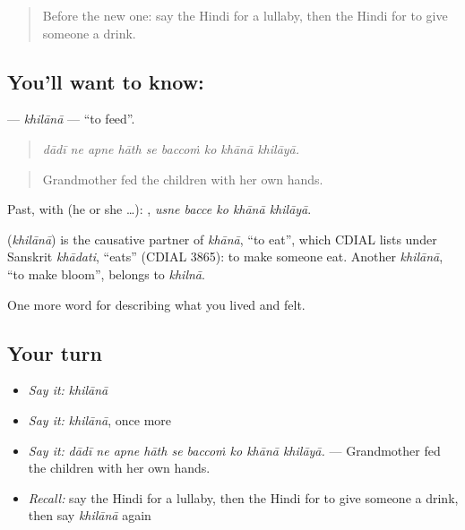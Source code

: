 \label{lesson:HI-C498-khilana}



\begin{quote}
Before the new one: say the Hindi for a lullaby, then the Hindi for to give someone a drink.
\end{quote}

\subsection*{You'll want to know: }
\textbf{} — \emph{khilānā} — \textquotedblleft{}to feed\textquotedblright{}.

\begin{quote}
        
\end{quote}

\begin{quote}
\emph{dādī ne apne hāth se baccoṁ ko khānā khilāyā.}
\end{quote}

\begin{quote}
Grandmother fed the children with her own hands.
\end{quote}

Past, with  (he or she …):     , \emph{usne bacce ko khānā khilāyā}.

\begin{cousinweb}
\textbf{} (\emph{khilānā}) is the causative partner of \emph{khānā}, \textquotedblleft{}to eat\textquotedblright{}, which CDIAL lists under Sanskrit \emph{khādati}, \textquotedblleft{}eats\textquotedblright{} (CDIAL 3865): to make someone eat. Another \emph{khilānā}, \textquotedblleft{}to make bloom\textquotedblright{}, belongs to \emph{khilnā}.
\end{cousinweb}

\begin{grammarlens}[title={What you've built}]
One more word for describing what you lived and felt.
\end{grammarlens}

\subsection*{Your turn}
\begin{itemize}
\raggedright
  \item \emph{Say it:} \emph{khilānā}
  \item \emph{Say it:} \emph{khilānā}, once more
  \item \emph{Say it:} \emph{dādī ne apne hāth se baccoṁ ko khānā khilāyā.} — Grandmother fed the children with her own hands.
  \item \emph{Recall:} say the Hindi for a lullaby, then the Hindi for to give someone a drink, then say \emph{khilānā} again
\end{itemize}

